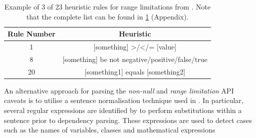 \begin{table}[]
	\begin{tabular}{|cc|}
		\hline
		Rule Number & Heuristic \\ \hline
		1 & [something] >/</= [value] \\
		8 & [something] be {not} negative/positive/false/true \\
		20 & [something1] equals [something2] \\ \hline
	\end{tabular}
	\caption{Example of 3 of 23 heuristic rules for range limitations from \cite{zhou-directive}. Note that the complete list can be found in \ref{tab:range-limit-heuristic} (Appendix).}
	\label{tab:range-limit-heuristic}
\end{table}

An alternative approach for parsing the \textit{non-null} and \textit{range limitation} API caveats is to utilise a sentence normalisation technique used in \cite{zhou-directive}. In particular, several regular expressions are identified by \citeauthor{zhou-directive} to perform substitutions within a sentence prior to dependency parsing. These expressions are used to detect cases such as the names of variables, classes and mathematical expressions

